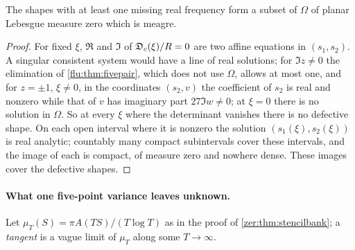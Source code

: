 \begin{proposition}\label{flu:prop:fivegeneric}
The shapes with at least one missing real frequency form a subset of $\Omega$ of planar Lebesgue measure zero
which is meagre.
\end{proposition}
\begin{proof}
For fixed $\xi$, $\Re$ and $\Im$ of $\mathfrak{D}_c(\xi)/R=0$ are two affine equations in $(s_1,s_2)$. A singular
consistent system would have a line of real solutions; for $\Im z\ne0$ the elimination of
\cref{flu:thm:fivepair}, which does not use $\Omega$, allows at most one, and for $z=\pm1$, $\xi\ne0$, in the
coordinates $(s_2,v)$ the coefficient of $s_2$ is real and nonzero while that of $v$ has imaginary part
$27\Im w\ne0$; at $\xi=0$ there is no solution in $\Omega$. So at every $\xi$ where the determinant vanishes there is
no defective shape. On each open interval where it is nonzero the solution $(s_1(\xi),s_2(\xi))$ is real analytic;
countably many compact subintervals cover these intervals, and the image of each is compact, of measure zero
and nowhere dense. These images cover the defective shapes.
\end{proof}

\paragraph{What one five-point variance leaves unknown.}
Let $\mu_T(S)=\pi A(TS)/(T\log T)$ as in the proof of \cref{zer:thm:stencilbank}; a \emph{tangent} is a vague limit
of $\mu_T$ along some $T\to\infty$.

